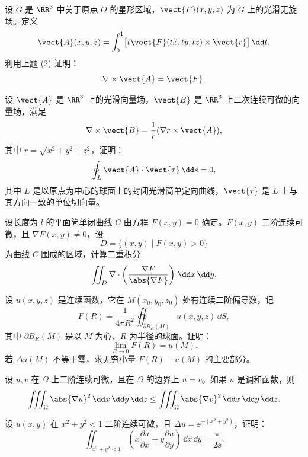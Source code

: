 \begin{xreferenceproblem}[2]
设 $G$ 是 $\RR^3$ 中关于原点 $O$ 的星形区域，$\vect{F}(x,y,z)$ 为 $G$ 上的光滑无旋场。定义
\[
  \vect{A}(x,y,z)=\int_0^1\bigl[t\vect{F}(tx,ty,tz)\times\vect{r}\bigr]\,\dd t.
\]
利用上题 (2) 证明：
\[
  \nabla\times\vect{A}=\vect{F}.
\]
\end{xreferenceproblem}

\begin{xreferenceproblem}[3]
设 $\vect{A}$ 是 $\RR^3$ 上的光滑向量场，$\vect{B}$ 是 $\RR^3$ 上二次连续可微的向量场，满足
\[
  \nabla\times\vect{B}=\frac{1}{r}(\nabla r\times\vect{A}),
\]
其中 $r=\sqrt{x^2+y^2+z^2}$，证明：
\[
  \oint_L\vect{A}\cdot\vect{\tau}\,\dd s=0,
\]
其中 $L$ 是以原点为中心的球面上的封闭光滑简单定向曲线，$\vect{\tau}$ 是 $L$ 上与其方向一致的单位切向量。
\end{xreferenceproblem}

\begin{xreferenceproblem}[4]
设长度为 $l$ 的平面简单闭曲线 $C$ 由方程 $F(x,y)=0$ 确定。$F(x,y)$ 二阶连续可微，且 $\nabla F(x,y)\ne0$，设
\[
  D=\{(x,y)\mid F(x,y)>0\}
\]
为曲线 $C$ 围成的区域，计算二重积分
\[
  \iint_D\nabla\cdot\left(\frac{\nabla F}{\abs{\nabla F}}\right)\,\dd x\,\dd y.
\]
\end{xreferenceproblem}

\begin{xreferenceproblem}[5]
设 $u(x,y,z)$ 是连续函数，它在 $M(x_0,y_0,z_0)$ 处有连续二阶偏导数，记
\[
  F(R)=\frac{1}{4\pi R^2}\oiint_{\partial B_R(M)}u(x,y,z)\,\dd S,
\]
其中 $\partial B_R(M)$ 是以 $M$ 为心、$R$ 为半径的球面。证明：
\[
  \lim_{R\to0}F(R)=u(M).
\]
若 $\Delta u(M)$ 不等于零，求无穷小量 $F(R)-u(M)$ 的主要部分。
\end{xreferenceproblem}

\begin{xreferenceproblem}[6]
设 $u,v$ 在 $\overline\Omega$ 上二阶连续可微，且在 $\Omega$ 的边界上 $u=v$。如果 $u$ 是调和函数，则
\[
  \iiint_\Omega\abs{\nabla u}^2\,\dd x\,\dd y\,\dd z
  \le\iiint_\Omega\abs{\nabla v}^2\,\dd x\,\dd y\,\dd z.
\]
\end{xreferenceproblem}

\begin{xreferenceproblem}[7]
设 $u(x,y)$ 在 $x^2+y^2<1$ 二阶连续可微，且 $\Delta u=\ee^{-(x^2+y^2)}$，证明：
\[
  \iint_{x^2+y^2<1}\left(x\frac{\partial u}{\partial x}+y\frac{\partial u}{\partial y}\right)\,\dd x\,\dd y
  =\frac{\pi}{2\ee}.
\]
\end{xreferenceproblem}

